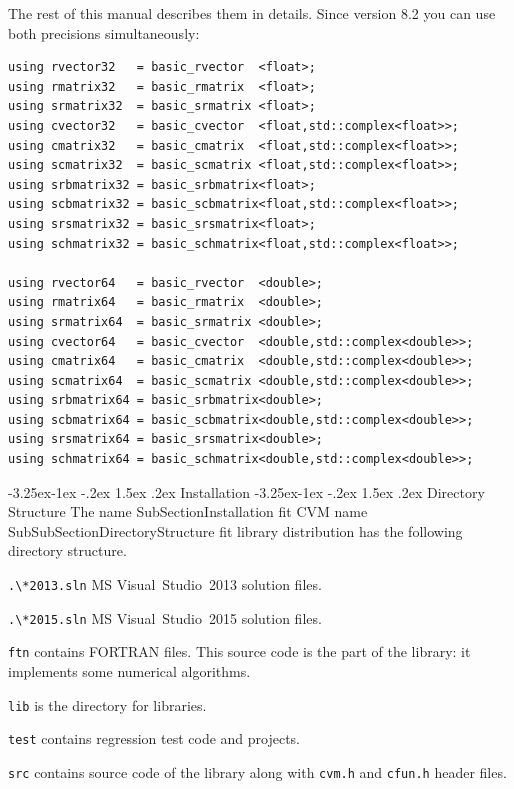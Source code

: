 \documentclass[12pt,letterpaper]{article}
\makeatletter
\newcommand{\FORTRAN}{\textsf{FORTRAN}\xspace}
\renewcommand\subsection{\@startsection{subsection}{2}{0mm}%
                                     {-3.25ex\@plus -1ex \@minus -.2ex}%
                                     {1.5ex \@plus .2ex}%
                                     {\normalfont\large\bfseries\sffamily}}
\renewcommand\subsubsection{\@startsection{subsubsection}{3}{0mm}%
                                     {-3.25ex\@plus -1ex \@minus -.2ex}%
                                     {1.5ex \@plus .2ex}%
                                     {\normalfont\normalsize\bfseries\sffamily}}
\makeatother
\begin{document}
The rest of this manual describes them in details.
Since version 8.2 you can use both precisions simultaneously:

\begin{Verbatim}
using rvector32   = basic_rvector  <float>;
using rmatrix32   = basic_rmatrix  <float>;
using srmatrix32  = basic_srmatrix <float>;
using cvector32   = basic_cvector  <float,std::complex<float>>;
using cmatrix32   = basic_cmatrix  <float,std::complex<float>>;
using scmatrix32  = basic_scmatrix <float,std::complex<float>>;
using srbmatrix32 = basic_srbmatrix<float>;
using scbmatrix32 = basic_scbmatrix<float,std::complex<float>>;
using srsmatrix32 = basic_srsmatrix<float>;
using schmatrix32 = basic_schmatrix<float,std::complex<float>>;

using rvector64   = basic_rvector  <double>;
using rmatrix64   = basic_rmatrix  <double>;
using srmatrix64  = basic_srmatrix <double>;
using cvector64   = basic_cvector  <double,std::complex<double>>;
using cmatrix64   = basic_cmatrix  <double,std::complex<double>>;
using scmatrix64  = basic_scmatrix <double,std::complex<double>>;
using srbmatrix64 = basic_srbmatrix<double>;
using scbmatrix64 = basic_scbmatrix<double,std::complex<double>>;
using srsmatrix64 = basic_srsmatrix<double>;
using schmatrix64 = basic_schmatrix<double,std::complex<double>>;
\end{Verbatim}




\subsection{Installation}
\subsubsection{Directory Structure}
The%
\pdfdest name {SubSectionInstallation} fit{}
CVM%
\pdfdest name {SubSubSectionDirectoryStructure} fit{}
library distribution has the following directory structure.
\begin{compactitem}
\item \verb".\*2013.sln" MS Visual~Studio~2013 solution files.
\item \verb".\*2015.sln" MS Visual~Studio~2015 solution files.
\item \verb"ftn" contains \FORTRAN{} files.
This source code
is the part of the library: it implements some
numerical algorithms.
\item \verb"lib" is the directory for libraries.
\item \verb"test" contains regression test code and projects.
\item \verb"src" contains source code of the library
along with \verb"cvm.h" and \verb"cfun.h" header files.
\end{compactitem}
\end{document}
